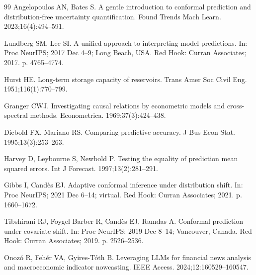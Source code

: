 \documentclass[12pt,a4paper]{article}
\begin{document}
\begin{singlespace}
\begin{thebibliography}{99}
Angelopoulos AN, Bates S. A gentle introduction to conformal prediction and
distribution-free uncertainty quantification. Found Trends Mach Learn.
2023;16(4):494--591.

Lundberg SM, Lee SI. A unified approach to interpreting model predictions.
In: Proc NeurIPS; 2017 Dec 4--9; Long Beach, USA. Red Hook: Curran
Associates; 2017. p. 4765--4774.

Hurst HE. Long-term storage capacity of reservoirs. Trans Amer Soc Civil
Eng. 1951;116(1):770--799.

Granger CWJ. Investigating causal relations by econometric models and
cross-spectral methods. Econometrica. 1969;37(3):424--438.

Diebold FX, Mariano RS. Comparing predictive accuracy. J Bus Econ Stat.
1995;13(3):253--263.

Harvey D, Leybourne S, Newbold P. Testing the equality of prediction mean
squared errors. Int J Forecast. 1997;13(2):281--291.

Gibbs I, Cand\`{e}s EJ. Adaptive conformal inference under distribution
shift. In: Proc NeurIPS; 2021 Dec 6--14; virtual. Red Hook: Curran
Associates; 2021. p. 1660--1672.

Tibshirani RJ, Foygel Barber R, Cand\`{e}s EJ, Ramdas A. Conformal
prediction under covariate shift. In: Proc NeurIPS; 2019 Dec 8--14;
Vancouver, Canada. Red Hook: Curran Associates; 2019. p. 2526--2536.

Onoz\'o R, Feh\'er VA, Gyires-T\'oth B. Leveraging LLMs for financial news
analysis and macroeconomic indicator nowcasting. IEEE Access.
2024;12:160529--160547.

\end{thebibliography}
\end{singlespace}
\end{document}
